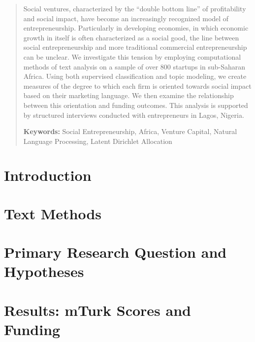 \documentclass[12pt]{article}
\begin{document}
\maketitle

\begin{abstract}
Social ventures, characterized by the “double bottom line” of profitability and social impact, have become an increasingly recognized model of entrepreneurship. Particularly in developing economies, in which economic growth in itself is often characterized as a social good, the line between social entrepreneurship and more traditional commercial entrepreneurship can be unclear. We investigate this tension by employing computational methods of text analysis on a sample of over 800 startups in sub-Saharan Africa. Using both supervised classification and topic modeling, we create measures of the degree to which each firm is oriented towards social impact based on their marketing language. We then examine the relationship between this orientation and funding outcomes. This analysis is supported by structured interviews conducted with entrepreneurs in Lagos, Nigeria.

\smallskip
\noindent \textbf{Keywords:} Social Entrepreneurship, Africa, Venture Capital, Natural Language Processing, Latent Dirichlet Allocation 

\end{abstract}


\section{Introduction}



\section{Text Methods}



\section{Primary Research Question and Hypotheses}


\section{Results: mTurk Scores and Funding}

\newpage
\end{document}
